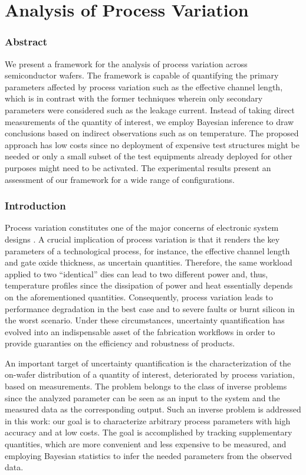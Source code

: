 \chapter{Analysis of Process Variation}

\subsection{Abstract}

We present a framework for the analysis of process variation across
semiconductor wafers. The framework is capable of quantifying the primary
parameters affected by process variation such as the effective channel length,
which is in contrast with the former techniques wherein only secondary
parameters were considered such as the leakage current. Instead of taking direct
measurements of the quantity of interest, we employ Bayesian inference to draw
conclusions based on indirect observations such as on temperature. The proposed
approach has low costs since no deployment of expensive test structures might be
needed or only a small subset of the test equipments already deployed for other
purposes might need to be activated. The experimental results present an
assessment of our framework for a wide range of configurations.

\subsection{Introduction}

Process variation constitutes one of the major concerns of electronic system
designs \cite{chandrakasan2000, srivastava2010}. A crucial implication of
process variation is that it renders the key parameters of a technological
process, for instance, the effective channel length and gate oxide thickness, as
uncertain quantities. Therefore, the same workload applied to two ``identical''
dies can lead to two different power and, thus, temperature profiles since the
dissipation of power and heat essentially depends on the aforementioned
quantities. Consequently, process variation leads to performance degradation in
the best case and to severe faults or burnt silicon in the worst scenario. Under
these circumstances, uncertainty quantification has evolved into an
indispensable asset of the fabrication workflows in order to provide guaranties
on the efficiency and robustness of products.

An important target of uncertainty quantification is the characterization of the
on-wafer distribution of a quantity of interest, deteriorated by process
variation, based on measurements. The problem belongs to the class of inverse
problems since the analyzed parameter can be seen as an input to the system and
the measured data as the corresponding output. Such an inverse problem is
addressed in this work: our goal is to characterize arbitrary process parameters
with high accuracy and at low costs. The goal is accomplished by tracking
supplementary quantities, which are more convenient and less expensive to be
measured, and employing Bayesian statistics \cite{gelman2004} to infer the
needed parameters from the observed data.

